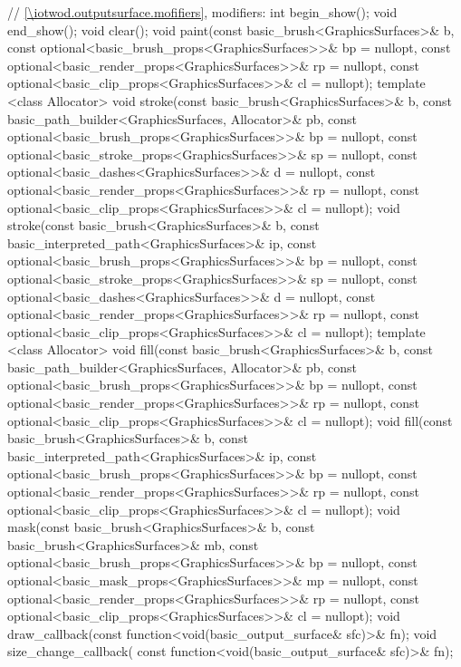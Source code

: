 \begin{codeblock}
{{    // \ref{\iotwod.outputsurface.mofifiers}, modifiers:
    int begin_show();
    void end_show();
    void clear();
    void paint(const basic_brush<GraphicsSurfaces>& b,
      const optional<basic_brush_props<GraphicsSurfaces>>& bp = nullopt,
      const optional<basic_render_props<GraphicsSurfaces>>& rp = nullopt,
      const optional<basic_clip_props<GraphicsSurfaces>>& cl = nullopt);
    template <class Allocator>
    void stroke(const basic_brush<GraphicsSurfaces>& b,
      const basic_path_builder<GraphicsSurfaces, Allocator>& pb,
      const optional<basic_brush_props<GraphicsSurfaces>>& bp = nullopt,
      const optional<basic_stroke_props<GraphicsSurfaces>>& sp = nullopt,
      const optional<basic_dashes<GraphicsSurfaces>>& d = nullopt,
      const optional<basic_render_props<GraphicsSurfaces>>& rp = nullopt,
      const optional<basic_clip_props<GraphicsSurfaces>>& cl = nullopt);
    void stroke(const basic_brush<GraphicsSurfaces>& b,
      const basic_interpreted_path<GraphicsSurfaces>& ip,
      const optional<basic_brush_props<GraphicsSurfaces>>& bp = nullopt,
      const optional<basic_stroke_props<GraphicsSurfaces>>& sp = nullopt,
      const optional<basic_dashes<GraphicsSurfaces>>& d = nullopt,
      const optional<basic_render_props<GraphicsSurfaces>>& rp = nullopt,
      const optional<basic_clip_props<GraphicsSurfaces>>& cl = nullopt);
    template <class Allocator>
    void fill(const basic_brush<GraphicsSurfaces>& b,
      const basic_path_builder<GraphicsSurfaces, Allocator>& pb,
      const optional<basic_brush_props<GraphicsSurfaces>>& bp = nullopt,
      const optional<basic_render_props<GraphicsSurfaces>>& rp = nullopt,
      const optional<basic_clip_props<GraphicsSurfaces>>& cl = nullopt);
    void fill(const basic_brush<GraphicsSurfaces>& b,
      const basic_interpreted_path<GraphicsSurfaces>& ip,
      const optional<basic_brush_props<GraphicsSurfaces>>& bp = nullopt,
      const optional<basic_render_props<GraphicsSurfaces>>& rp = nullopt,
      const optional<basic_clip_props<GraphicsSurfaces>>& cl = nullopt);
    void mask(const basic_brush<GraphicsSurfaces>& b,
      const basic_brush<GraphicsSurfaces>& mb,
      const optional<basic_brush_props<GraphicsSurfaces>>& bp = nullopt,
      const optional<basic_mask_props<GraphicsSurfaces>>& mp = nullopt,
      const optional<basic_render_props<GraphicsSurfaces>>& rp = nullopt,
      const optional<basic_clip_props<GraphicsSurfaces>>& cl = nullopt);
    void draw_callback(const function<void(basic_output_surface& sfc)>& fn);
    void size_change_callback(
      const function<void(basic_output_surface& sfc)>& fn);
}}
\end{codeblock}
